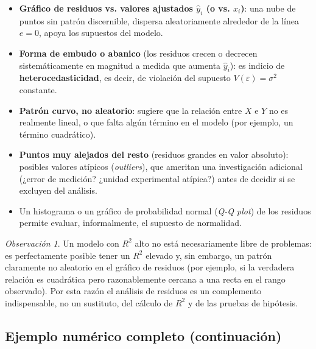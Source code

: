 \documentclass[11pt,a4paper]{article}
\theoremstyle{plain}
\theoremstyle{definition}
\theoremstyle{remark}
\newtheorem{observacion}[teorema]{Observación}
\begin{document}
\begin{itemize}
\item \textbf{Gráfico de residuos vs. valores ajustados $\hat y_i$ (o vs. $x_i$)}: una nube de puntos sin patrón discernible, dispersa aleatoriamente alrededor de la línea $e=0$, apoya los supuestos del modelo.
\item \textbf{Forma de embudo o abanico} (los residuos crecen o decrecen sistemáticamente en magnitud a medida que aumenta $\hat y_i$): es indicio de \textbf{heterocedasticidad}, es decir, de violación del supuesto $V(\varepsilon)=\sigma^2$ constante.
\item \textbf{Patrón curvo, no aleatorio}: sugiere que la relación entre $X$ e $Y$ no es realmente lineal, o que falta algún término en el modelo (por ejemplo, un término cuadrático).
\item \textbf{Puntos muy alejados del resto} (residuos grandes en valor absoluto): posibles valores atípicos (\emph{outliers}), que ameritan una investigación adicional (¿error de medición? ¿unidad experimental atípica?) antes de decidir si se excluyen del análisis.
\item Un histograma o un gráfico de probabilidad normal (\emph{Q-Q plot}) de los residuos permite evaluar, informalmente, el supuesto de normalidad.
\end{itemize}

\begin{observacion}
Un modelo con $R^2$ alto no está necesariamente libre de problemas: es perfectamente posible tener un $R^2$ elevado y, sin embargo, un patrón claramente no aleatorio en el gráfico de residuos (por ejemplo, si la verdadera relación es cuadrática pero razonablemente cercana a una recta en el rango observado). Por esta razón el análisis de residuos es un complemento indispensable, no un sustituto, del cálculo de $R^2$ y de las pruebas de hipótesis.
\end{observacion}

\subsection{Ejemplo numérico completo (continuación)}
\end{document}
